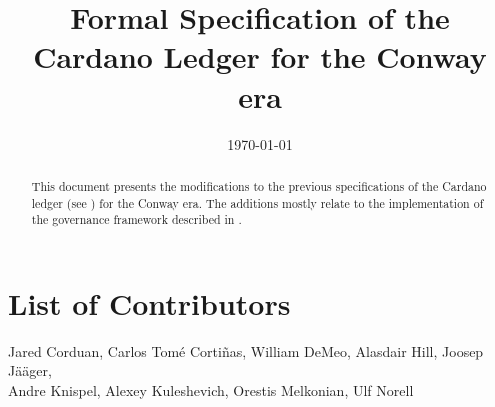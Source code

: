 \documentclass[11pt,a4paper,dvipsnames]{article}
\begin{document}
\title{Formal Specification of the Cardano Ledger for the Conway era}

\author{}

\date{\today}

\maketitle

\section*{List of Contributors}
\label{acknowledgements}

Jared Corduan,
Carlos Tom\'{e} Corti\~{n}as,
William DeMeo,
Alasdair Hill,
Joosep Jääger,\\
Andre Knispel,
Alexey Kuleshevich,
Orestis Melkonian,
Ulf Norell

\begin{abstract}
  This document presents the modifications to the previous
  specifications of the Cardano ledger (see
  \cite{shelley-ledger-spec,shelley-ma-ledger-spec,alonzo-ledger-spec,babbage-ledger-spec})
  for the Conway era.  The additions mostly relate to the implementation of the governance
  framework described in \cite{cip1694}.
\end{abstract}

\tableofcontents

\clearpage

















\clearpage

\printbibliography

\clearpage

\appendix




\end{document}
